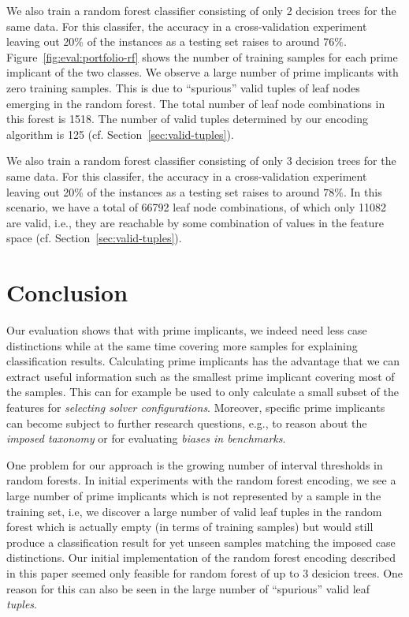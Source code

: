 \documentclass[a4paper, USenglish, cleveref, autoref, thm-restate]{lipics-v2021}
\theoremstyle{definition}
\begin{document}
We also train a random forest classifier consisting of only 2 decision trees for the same data. 
For this classifer, the accuracy in a cross-validation experiment leaving out 20\% of the instances as a testing set raises to around $76\%$. 
Figure~\ref{fig:eval:portfolio-rf} shows the number of training samples for each prime implicant of the two classes. 
We observe a large number of prime implicants with zero training samples. 
This is due to ``spurious'' valid tuples of leaf nodes emerging in the random forest. 
The total number of leaf node combinations in this forest is 1518. 
The number of valid tuples determined by our encoding algorithm is 125 (cf. Section~\ref{sec:valid-tuples}). 

We also train a random forest classifier consisting of only 3 decision trees for the same data. 
For this classifer, the accuracy in a cross-validation experiment leaving out 20\% of the instances as a testing set raises to around $78\%$. 
In this scenario, we have a total of 66792 leaf node combinations, of which only 11082 are valid, i.e., they are reachable by some combination of values in the feature space (cf. Section~\ref{sec:valid-tuples}). 


\section{Conclusion}
\label{sec:conclusion}

Our evaluation shows that with prime implicants, we indeed need less case distinctions while at the same time covering more samples for explaining classification results. 
Calculating prime implicants has the advantage that we can extract useful information such as the smallest prime implicant covering most of the samples. 
This can for example be used to only calculate a small subset of the features for \emph{selecting solver configurations}. 
Moreover, specific prime implicants can become subject to further research questions, e.g., to reason about the \emph{imposed taxonomy} or for evaluating \emph{biases in benchmarks}. 

One problem for our approach is the growing number of interval thresholds in random forests. 
In initial experiments with the random forest encoding, we see a large number of prime implicants which is not represented by a sample in the training set, i.e, we discover a large number of valid leaf tuples in the random forest which is actually empty (in terms of training samples) but would still produce a classification result for yet unseen samples matching the imposed case distinctions. 
Our initial implementation of the random forest encoding described in this paper seemed only feasible for random forest of up to 3 desicion trees. 
One reason for this can also be seen in the large number of ``spurious'' valid leaf \emph{tuples}. 
\end{document}
